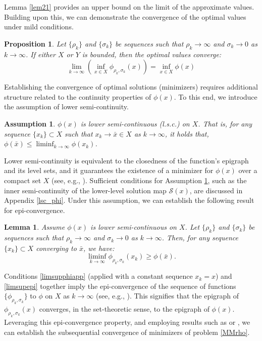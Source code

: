 \documentclass{article}
\newtheorem{assumption}{Assumption}
\newtheorem{lemma}[theorem]{Lemma}
\newtheorem{proposition}[theorem]{Proposition}
\begin{document}
Lemma \ref{lem21} provides an upper bound on the limit of the approximate values. Building upon this, we can demonstrate the convergence of the optimal values under mild conditions.
\begin{proposition}\label{prop21}
     Let $\{\rho_k\}$ and $\{\sigma_k\}$ be sequences such that $\rho_k \rightarrow \infty$ and $\sigma_k \rightarrow 0$ as $k \rightarrow \infty$. If either $X$ or $Y$ is bounded, then the optimal values converge:
     \[
     \lim\limits_{k\to\infty} \left(\inf_{ x\in {X}}\phi_{\rho_k, \sigma_k}(x)\right) = \inf_{x\in {X}}\phi (x)
     \]
\end{proposition}
     
Establishing the convergence of optimal solutions (minimizers) requires additional structure related to the continuity properties of  $\phi(x)$. To this end, we introduce the assumption of lower semi-continuity.

\begin{assumption}\label{assump_lsc}
    $\phi(x)$ is lower semi-continuous (l.s.c.) on $X$. That is, for any sequence $\{x_k\} \subset X$ such that $x_k \rightarrow \bar{x} \in X$ as $k \rightarrow \infty$, it holds that, $\phi(\bar{x}) \le \liminf_{k \rightarrow \infty} \phi(x_k)$.
\end{assumption}


Lower semi-continuity is equivalent to the closedness of the function's epigraph and its level sets, and it guarantees the existence of a minimizer for $\phi(x)$ over a compact set $X$ (see, e.g., \cite[Theorem 1.9]{rockafellar2009variational}). Sufficient conditions for Assumption \ref{assump_lsc}, such as the inner semi-continuity of the lower-level solution map $\mathcal{S}(x)$, are discussed in Appendix \ref{lsc_phi}. Under this assumption,  
we can establish the following result for epi-convergence.
\begin{lemma}\label{lem_liminf}
    Assume $\phi(x)$ is lower semi-continuous on $X$. Let $\{\rho_k\}$ and $\{\sigma_k\}$ be sequences such that $\rho_k \rightarrow \infty$ and $\sigma_k \rightarrow 0$ as $k \rightarrow \infty$. Then, for any sequence $\{x_k\} \subset X$ converging to $\bar{x}$, we have:
    \begin{equation}\label{limsupepi}
        \liminf\limits_{k\to\infty}\phi_{\rho_k, \sigma_k}(x_k)\ge\phi(\bar{x}).
    \end{equation}
\end{lemma}

Conditions \eqref{limsupphiapp} (applied with a constant sequence $x_k = x$) and \eqref{limsupepi} together imply the epi-convergence of the sequence of functions $\{\phi_{\rho_k, \sigma_k}\}$ to $\phi$ on $X$ as $k \rightarrow \infty$ (see, e.g., \cite[Proposition 7.2]{rockafellar2009variational}). This signifies that the epigraph of 
$\phi_{\rho_k, \sigma_k}(x)$ converges, in the set-theoretic sense, to the epigraph of  $\phi(x)$. Leveraging this epi-convergence property, and employing results such as \cite[Proposition 4.6]{bonnans2013perturbation} or \cite[Theorem 7.31]{rockafellar2009variational}, we can establish the subsequential convergence of minimizers of problem \eqref{MMrho}.
\end{document}

